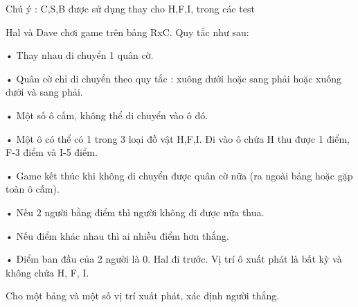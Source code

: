 Chú ý : C,S,B được sử dụng thay cho H,F,I, trong các test     

   Hal và Dave chơi game trên bảng RxC. Quy tắc như sau:  

   • Thay nhau di chuyển 1 quân cờ.  

   • Quân cờ chỉ di chuyển theo quy tắc : xuông dưới hoặc sang phải  hoặc xuống dưới và sang phải.  

   • Một số ô cấm, không thể di chuyển vào ô đó.  

   • Một ô có thể có 1 trong 3 loại đồ vật H,F,I. Đi vào ô chứa  H thu được 1 điểm, F-3 điểm và I-5 điểm.  

   • Game kết thúc khi không di chuyển được quân cờ nữa (ra ngoài  bảng hoặc gặp toàn ô cấm).  

   • Nếu 2 người bằng điểm thì người không đi được nữa thua.  

   • Nếu điểm khác nhau thì ai nhiều điểm hơn thắng.  

   • Điểm ban đầu của 2 người là 0. Hal đi trước. Vị trí ô xuất phát  là bất kỳ và không chứa H, F, I.  

   Cho một bảng và một số vị trí xuất phát, xác định người thắng.  

\